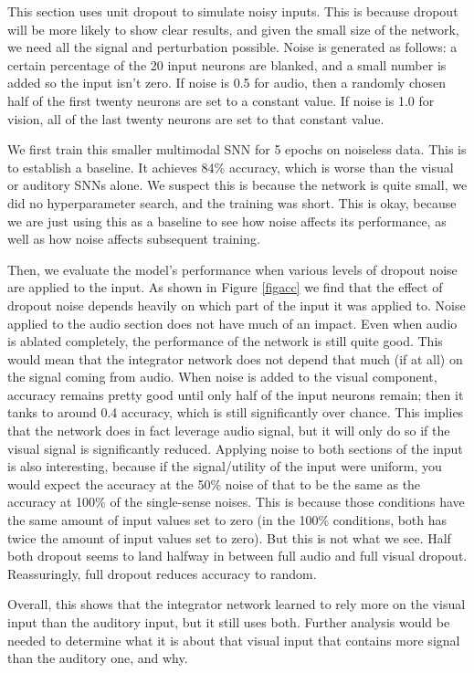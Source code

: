 \documentclass[conference]{IEEEtran}
\begin{document}
This section uses unit dropout to simulate noisy inputs. This is because dropout will be more likely to show clear results, and given the small size of the network, we need all the signal and perturbation possible. Noise is generated as follows: a certain percentage of the 20 input neurons are blanked, and a small number is added so the input isn't zero. If noise is 0.5 for audio, then a randomly chosen half of the first twenty neurons are set to a constant value. If noise is 1.0 for vision, all of the last twenty neurons are set to that constant value.

We first train this smaller multimodal SNN for 5 epochs on noiseless data. This is to establish a baseline. It achieves 84\% accuracy, which is worse than the visual or auditory SNNs alone. We suspect this is because the network is quite small, we did no hyperparameter search, and the training was short. This is okay, because we are just using this as a baseline to see how noise affects its performance, as well as how noise affects subsequent training.

Then, we evaluate the model's performance when various levels of dropout noise are applied to the input. As shown in Figure \ref{figacc} we find that the effect of dropout noise depends heavily on which part of the input it was applied to. Noise applied to the audio section does not have much of an impact. Even when audio is ablated completely, the performance of the network is still quite good. This would mean that the integrator network does not depend that much (if at all) on the signal coming from audio. When noise is added to the visual component, accuracy remains pretty good until only half of the input neurons remain; then it tanks to around 0.4 accuracy, which is still significantly over chance. This implies that the network does in fact leverage audio signal, but it will only do so if the visual signal is significantly reduced. Applying noise to both sections of the input is also interesting, because if the signal/utility of the input were uniform, you would expect the accuracy at the 50\% noise of that to be the same as the accuracy at 100\% of the single-sense noises. This is because those conditions have the same amount of input values set to zero (in the 100\% conditions, both has twice the amount of input values set to zero). But this is not what we see. Half both dropout seems to land halfway in between full audio and full visual dropout. Reassuringly, full dropout reduces accuracy to random.

Overall, this shows that the integrator network learned to rely more on the visual input than the auditory input, but it still uses both. Further analysis would be needed to determine what it is about that visual input that contains more signal than the auditory one, and why.
\end{document}
